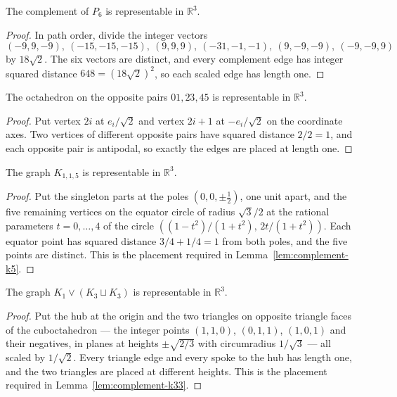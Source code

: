 \begin{lemma}
  \label{lem:path-complement}
  \leanok
  The complement of $P_6$ is representable in $\mathbb{R}^3$.
\end{lemma}
\begin{proof}
  In path order, divide the integer vectors
  \[
  (-9,9,-9),\ (-15,-15,-15),\ (9,9,9),\ (-31,-1,-1),\ (9,-9,-9),\ (-9,-9,9)
  \]
  by $18\sqrt2$. The six vectors are distinct, and every complement edge has integer squared
  distance $648 = (18\sqrt2)^2$, so each scaled edge has length one.
\end{proof}

\begin{lemma}
  \label{lem:octahedron}
  \leanok
  The octahedron on the opposite pairs $01, 23, 45$ is representable in $\mathbb{R}^3$.
\end{lemma}
\begin{proof}
  Put vertex $2i$ at $e_i/\sqrt2$ and vertex $2i + 1$ at $-e_i/\sqrt2$ on the coordinate
  axes. Two vertices of different opposite pairs have squared distance $2/2 = 1$, and each
  opposite pair is antipodal, so exactly the edges are placed at length one.
\end{proof}

\begin{lemma}[$K_{1,1,5}$]
  \label{lem:k115}
  \leanok
  The graph $K_{1,1,5}$ is representable in $\mathbb{R}^3$.
\end{lemma}
\begin{proof}
  Put the singleton parts at the poles $(0, 0, \pm\tfrac12)$, one unit apart, and the five
  remaining vertices on the equator circle of radius $\sqrt3/2$ at the rational parameters
  $t = 0, \dots, 4$ of the circle $((1 - t^2)/(1 + t^2),\, 2t/(1 + t^2))$. Each equator point
  has squared distance $3/4 + 1/4 = 1$ from both poles, and the five points are distinct.
  This is the placement required in Lemma~\ref{lem:complement-k5}.
\end{proof}

\begin{lemma}
  \label{lem:cone}
  \leanok
  The graph $K_1 \vee (K_3 \sqcup K_3)$ is representable in $\mathbb{R}^3$.
\end{lemma}
\begin{proof}
  Put the hub at the origin and the two triangles on opposite triangle faces of the
  cuboctahedron --- the integer points $(1, 1, 0)$, $(0, 1, 1)$, $(1, 0, 1)$ and their
  negatives, in planes at heights $\pm\sqrt{2/3}$ with circumradius $1/\sqrt3$ --- all scaled
  by $1/\sqrt2$. Every triangle edge and every spoke to the hub has length one, and the two
  triangles are placed at different heights. This is the placement required in
  Lemma~\ref{lem:complement-k33}.
\end{proof}

